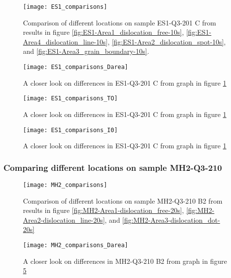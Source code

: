 \begin{figure}[H]
\centering
\texttt{[image: ES1\_comparisons]}
\caption[ES1-Q3-201 comparisons]{Comparison of different locations on sample ES1-Q3-201 C from results in figure \ref{fig:ES1-Area1_dislocation_free-10s}, \ref{fig:ES1-Area4_dislocation_line-10s}, \ref{fig:ES1-Area2_dislocation_spot-10s}, and \ref{fig:ES1-Area3_grain_boundary-10s}. }
\label{fig:ES1_comparisons}%
\end{figure}

\begin{figure}[H]
\centering
\texttt{[image: ES1\_comparisons\_Darea]}
\caption[ES1-Q3-201 comparisons close]{A closer look on differences in ES1-Q3-201 C from graph in figure \ref{fig:ES1_comparisons} }
\label{fig:ES1_comparisons_Darea}%
\end{figure}

\begin{figure}[H]
\centering
\texttt{[image: ES1\_comparisons\_TO]}
\caption[ES1-Q3-201 comparisons close]{A closer look on differences in ES1-Q3-201 C from graph in figure \ref{fig:ES1_comparisons} }
\label{fig:ES1_comparisons_TO}%
\end{figure}

\begin{figure}[H]
\centering
\texttt{[image: ES1\_comparisons\_I0]}
\caption[ES1-Q3-201 comparisons close]{A closer look on differences in ES1-Q3-201 C from graph in figure \ref{fig:ES1_comparisons} }
\label{fig:ES1_comparisons_I0}%
\end{figure}


\subsubsection{Comparing different locations on sample MH2-Q3-210}

\begin{figure}[H]
\centering
\texttt{[image: MH2\_comparisons]}
\caption[MH2-Q3-210 comparisons]{Comparison of different locations on sample MH2-Q3-210 B2 from results in figure \ref{fig:MH2-Area1-dislocation_free-20s}, \ref{fig:MH2-Area2-dislocation_line-20s}, and \ref{fig:MH2-Area3-dislocation_dot-20s} }
\label{fig:MH2_comparisons}%
\end{figure}


\begin{figure}[H]
\centering
\texttt{[image: MH2\_comparisons\_Darea]}
\caption[MH2-Q3-210 comparisons close]{A closer look on differences in MH2-Q3-210 B2 from graph in figure \ref{fig:MH2_comparisons} }
\label{fig:MH2_comparisons_Darea}%
\end{figure}

